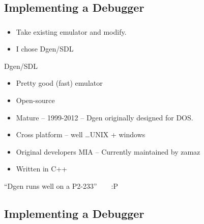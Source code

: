 \documentclass{beamer}
\begin{document}

\subsection{Implementing a Debugger}

\begin{frame}[fragile]
\frametitle{\insertsubsection}

\begin{itemize}
\item Take existing emulator and modify.
\item I chose Dgen/SDL
\end{itemize}

\vfill

\begin{block}{Dgen/SDL}
\begin{itemize}
\item Pretty good (fast) emulator
\item Open-source
\item Mature --  1999-2012 -- Dgen originally designed for DOS.
\item Cross platform -- well \ldots UNIX + windows
\item Original developers MIA -- Currently maintained by zamaz
\item Written in C++
\end{itemize}
\end{block}

\vfill

{\Large ``Dgen runs well on a P2-233''~~~~:P}

\end{frame}

\subsection{Implementing a Debugger}
\end{document}
